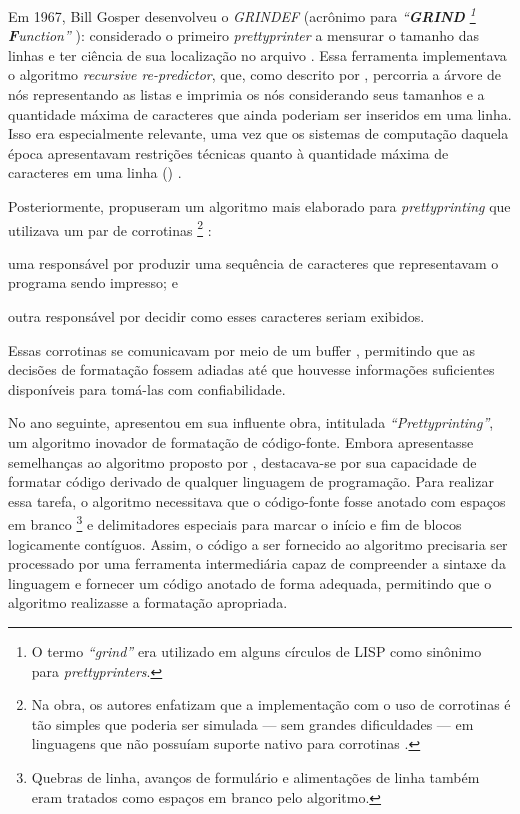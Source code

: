 \documentclass
  [11pt,a4paper,english,brazil,openright,sumario=tradicional,twoside]
  {abntex2}
\begin{document}
  Em 1967, Bill Gosper desenvolveu o \textit{GRINDEF} (acrônimo para
  \textit
    {%
      ``\textbf{GRIND}%
      \footnote
        { O termo \textit{``grind''} era utilizado em alguns círculos de LISP
          como sinônimo para \textit{prettyprinters}.}
      \textbf{F}unction''}%
  ): considerado o primeiro \textit{prettyprinter} a mensurar o tamanho das
  linhas e ter ciência de sua localização no arquivo
  \cites{gosper-2023-twubblesome}{griesemer-2022-cultural}. Essa ferramenta
  implementava o algoritmo \textit{recursive re-predictor}, que, como descrito
  por \textcite{goldstein-1973-pretty}, percorria a árvore de nós representando
  as listas e imprimia os nós considerando seus tamanhos e a quantidade máxima
  de caracteres que ainda poderiam ser inseridos em uma linha. Isso era
  especialmente relevante, uma vez que os sistemas de computação daquela época
  apresentavam restrições técnicas quanto à quantidade máxima de caracteres em
  uma linha (\textit{}) \cite{wiki-2023-characters}.

  Posteriormente, \textcite{hearn-1979-one} propuseram um algoritmo mais
  elaborado para \textit{prettyprinting} que utilizava um par de corrotinas%
  \footnote
    { Na obra, os autores enfatizam que a implementação com o uso de corrotinas
      é tão simples que poderia ser simulada --- sem grandes dificuldades ---
      em linguagens que não possuíam suporte nativo para corrotinas
      \cite[53]{hearn-1979-one}.}%
  :
  \begin{inparaenum}
    \item uma responsável por produzir uma sequência de caracteres que
          representavam o programa sendo impresso; e
    \item outra responsável por decidir como esses caracteres seriam exibidos.
  \end{inparaenum}
  Essas corrotinas se comunicavam por meio de um buffer ,
  permitindo que as decisões de formatação fossem adiadas até que houvesse
  informações suficientes disponíveis para tomá-las com confiabilidade.

  No ano seguinte, \textcite{oppen-1980-prettyprinting} apresentou em sua
  influente obra, intitulada \textit{``Prettyprinting''}, um algoritmo inovador
  de formatação de código-fonte. Embora apresentasse semelhanças ao algoritmo
  proposto por \textcite{hearn-1979-one}, destacava-se por sua capacidade de
  formatar código derivado de qualquer linguagem de programação. Para realizar
  essa tarefa, o algoritmo necessitava que o código-fonte fosse anotado com
  espaços em branco%
  \footnote
    { Quebras de linha, avanços de formulário e alimentações de linha também
      eram tratados como espaços em branco pelo algoritmo.}
  e delimitadores especiais para marcar o início e fim de blocos logicamente
  contíguos. Assim, o código a ser fornecido ao algoritmo precisaria ser
  processado por uma ferramenta intermediária capaz de compreender a sintaxe da
  linguagem e fornecer um código anotado de forma adequada, permitindo que o
  algoritmo realizasse a formatação apropriada.
\end{document}
